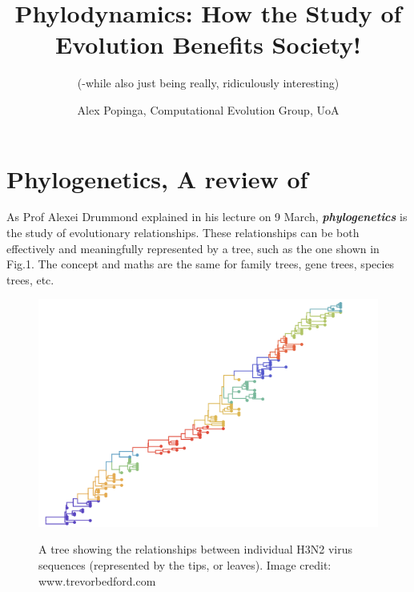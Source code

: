 \documentclass{scrartcl}
\begin{document}
\title{Phylodynamics:  How the Study of Evolution Benefits Society!}

\subtitle{(-while also just being really, ridiculously interesting)}
\author{Alex Popinga, Computational Evolution Group, UoA}
\date{}
\maketitle

\section{Phylogenetics, A review of}

As Prof Alexei Drummond explained in his lecture on 9 March, \textbf{\textit{phylogenetics}} is the study of evolutionary relationships.  
These relationships can be both effectively and meaningfully represented by a tree, such as the one shown in Fig.1.
The concept and maths are the same for family trees, gene trees, species trees, etc.  

\begin{figure}[H] 
\center
{\includegraphics[width=0.7\linewidth]{tree.png}}
\caption{A tree showing the relationships between individual H3N2 virus sequences (represented by the tips, or leaves). Image credit: www.trevorbedford.com}
\label{sequences}
\end{figure}

\vspace{2mm}
\end{document}
